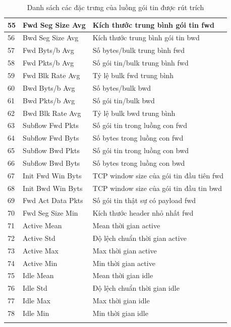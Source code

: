 \begin{center}
\begin{longtable}{|l|l|l|}
		55 & Fwd Seg Size Avg  & Kích   thước trung bình gói tin fwd                \\ \hline
		56 & Bwd Seg Size Avg  & Kích   thước trung bình gói tin bwd                \\ \hline
		57 & Fwd Byts/b Avg    & Số   bytes/bulk trung bình fwd                     \\ \hline
		58 & Fwd Pkts/b Avg    & Số   gói tin/bulk trung bình fwd                   \\ \hline
		59 & Fwd Blk Rate Avg  & Tỷ   lệ bulk fwd trung bình                        \\ \hline
		60 & Bwd Byts/b Avg    & Số   bytes/bulk bwd                                \\ \hline
		61 & Bwd Pkts/b Avg    & Số   gói tin/bulk bwd                              \\ \hline
		62 & Bwd Blk Rate Avg  & Tỷ   lệ bulk bwd trung bình                        \\ \hline
		63 & Subflow Fwd Pkts  & Số   gói tin trong luồng con fwd                   \\ \hline
		64 & Subflow Fwd Byts  & Số   bytes trong luồng con fwd                     \\ \hline
		65 & Subflow Bwd Pkts  & Số   gói tin trong luồng con bwd                   \\ \hline
		66 & Subflow Bwd Byts  & Số   bytes trong luồng con  bwd                    \\ \hline
		67 & Init Fwd Win Byts & TCP   window size của gói tin đầu tiên fwd         \\ \hline
		68 & Init Bwd Win Byts & TCP   window size của gói tin đầu tin bwd          \\ \hline
		69 & Fwd Act Data Pkts & Số   gói tin thật sự có payload fwd                \\ \hline
		70 & Fwd Seg Size Min  & Kích   thước header nhỏ nhất fwd                   \\ \hline
		71 & Active Mean       & Mean   thời gian active                            \\ \hline
		72 & Active Std        & Độ   lệch chuẩn thời gian active                   \\ \hline
		73 & Active Max        & Max   thời gian active                             \\ \hline
		74 & Active Min        & Min   thời gian active                             \\ \hline
		75 & Idle Mean         & Mean   thời gian idle                              \\ \hline
		76 & Idle Std          & Độ   lệch chuẩn thời gian idle                     \\ \hline
		77 & Idle Max          & Max   thời gian idle                               \\ \hline
		78 & Idle Min          & Min   thời gian idle                               \\ \hline
	\caption{Danh sách các đặc trưng của luồng gói tin được rút trích}
	\label{tab:feature-list}
	\end{longtable}
\end{center}

